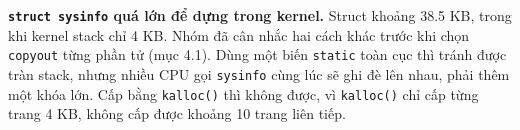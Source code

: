 \item \textbf{\texttt{struct sysinfo} quá lớn để dựng trong kernel.} Struct khoảng 38.5 KB, trong khi kernel stack chỉ 4 KB. Nhóm đã cân nhắc hai cách khác trước khi chọn \texttt{copyout} từng phần tử (mục 4.1). Dùng một biến \texttt{static} toàn cục thì tránh được tràn stack, nhưng nhiều CPU gọi \texttt{sysinfo} cùng lúc sẽ ghi đè lên nhau, phải thêm một khóa lớn. Cấp bằng \texttt{kalloc()} thì không được, vì \texttt{kalloc()} chỉ cấp từng trang 4 KB, không cấp được khoảng 10 trang liên tiếp.
